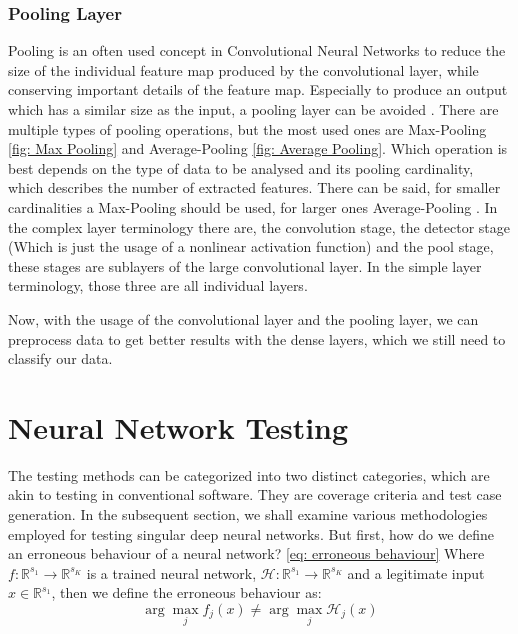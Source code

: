 \subsubsection{Pooling Layer}
Pooling is an often used concept in Convolutional Neural Networks to reduce the size of the individual feature map produced by the convolutional layer, while conserving important details of the feature map.
Especially to produce an output which has a similar size as the input, a pooling layer can be avoided \cite{jain_supervised_2007}.
There are multiple types of pooling operations, but the most used ones are Max-Pooling \ref{fig: Max Pooling} and Average-Pooling \ref{fig: Average Pooling}.
Which operation is best depends on the type of data to be analysed and its pooling cardinality, which describes the number of extracted features.
There can be said, for smaller cardinalities a Max-Pooling should be used, for larger ones Average-Pooling \cite{boureau_theoretical_2010}.
In the complex layer terminology \cite{goodfellow_deep_2016} there are, the convolution stage, the detector stage (Which is just the usage of a nonlinear activation function) and the pool stage, these stages are sublayers of the large convolutional layer.
In the simple layer terminology, those three are all individual layers.


Now, with the usage of the convolutional layer and the pooling layer, we can preprocess data to get better results with the dense layers, which we still need to classify our data.


\section{Neural Network Testing}\label{sec:neural-network-testing}
The testing methods can be categorized into two distinct categories, which are akin to testing in conventional software.
They are coverage criteria and test case generation.
In the subsequent section, we shall examine various methodologies employed for testing singular deep neural networks.\cite{huang_survey_2020}
But first, how do we define an erroneous behaviour of a neural network? \ref{eq: erroneous behaviour}
Where $f: \mathbb{R}^{s_1} \to \mathbb{R}^{s_K}$ is a trained neural network, $\mathcal{H}: \mathbb{R}^{s_1} \to \mathbb{R}^{s_K}$ and a legitimate input $x \in \mathbb{R}^{s_1}$, then we define the erroneous behaviour as:
\begin{equation}
    \arg \max_{j} f_j (x) \neq \arg \max_{j} \mathcal{H}_j (x)
    \label{eq: erroneous behaviour}
\end{equation}

